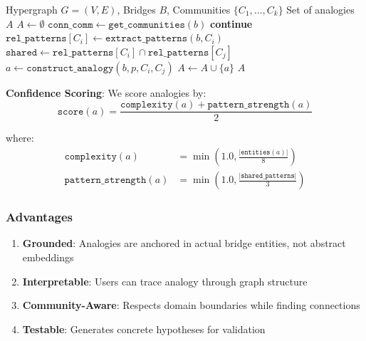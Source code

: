 \documentclass[11pt,twocolumn]{article}
\begin{document}
\begin{algorithm}[t]
\caption{Bridge-Mediated Analogy Discovery}
\label{alg:bridge-analogy}
\begin{algorithmic}[1]
\Require Hypergraph $G = (V, E)$, Bridges $B$, Communities $\{C_1, \ldots, C_k\}$
\Ensure Set of analogies $A$
\State $A \gets \emptyset$
    \State $\texttt{conn\_comm} \gets \texttt{get\_communities}(b)$
        \State \textbf{continue}
    \EndIf
        \State $\texttt{rel\_patterns}[C_i] \gets \texttt{extract\_patterns}(b, C_i)$
    \EndFor
        \State $\texttt{shared} \gets \texttt{rel\_patterns}[C_i] \cap \texttt{rel\_patterns}[C_j]$
            \State $a \gets \texttt{construct\_analogy}(b, p, C_i, C_j)$
                \State $A \gets A \cup \{a\}$
            \EndIf
        \EndFor
    \EndFor
\EndFor
\State \Return $A$
\end{algorithmic}
\end{algorithm}

\textbf{Confidence Scoring}: We score analogies by:
\begin{equation}
\texttt{score}(a) = \frac{\texttt{complexity}(a) + \texttt{pattern\_strength}(a)}{2}
\end{equation}

where:
\begin{align}
\texttt{complexity}(a) &= \min\left(1.0, \frac{|\texttt{entities}(a)|}{8}\right) \\
\texttt{pattern\_strength}(a) &= \min\left(1.0, \frac{|\texttt{shared\_patterns}|}{3}\right)
\end{align}

\subsubsection{Advantages}

\begin{enumerate}
\item \textbf{Grounded}: Analogies are anchored in actual bridge entities, not abstract embeddings
\item \textbf{Interpretable}: Users can trace analogy through graph structure
\item \textbf{Community-Aware}: Respects domain boundaries while finding connections
\item \textbf{Testable}: Generates concrete hypotheses for validation
\end{enumerate}
\end{document}
